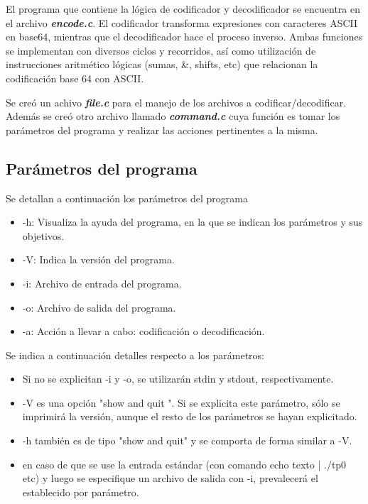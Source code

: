 \documentclass[10pt,a4paper]{article}
\begin{document}
El programa que contiene la lógica de codificador y decodificador se encuentra en el archivo \textit{\textbf{encode.c}}.
El codificador transforma expresiones con caracteres ASCII en base64, mientras que el decodificador hace el proceso inverso.
Ambas funciones se implementan con diversos ciclos y recorridos, así como utilización de instrucciones aritmético lógicas (sumas, \&, shifts, etc) que relacionan la codificación base 64 con ASCII.

Se creó un achivo \textit{\textbf{file.c}} para el manejo de los archivos a codificar/decodificar. Además se creó otro archivo llamado \textit{\textbf{command.c}} cuya función es tomar los parámetros del programa y realizar las acciones pertinentes a la misma. 

\newpage

\subsection{Parámetros del programa}

Se detallan a continuación los parámetros del programa

\begin{itemize}
    \item -h: Visualiza la ayuda del programa, en la que se indican los parámetros y sus objetivos.
    \item -V: Indica la versión del programa.
    \item -i: Archivo de entrada del programa.
    \item -o: Archivo de salida del programa.
    \item -a: Acción a llevar a cabo: codificación o decodificación.
\end{itemize}

Se indica a continuación detalles respecto a los parámetros:

\begin{itemize}
    \item Si no se explicitan -i y -o, se utilizarán stdin y stdout, respectivamente. 
    \item -V es una opción "show and quit ". Si se explicita este parámetro, sólo se imprimirá la versión, aunque el resto de los parámetros se hayan explicitado. 
    \item -h también es de tipo "show and quit" y se comporta de forma similar a -V.
    \item en caso de que se use la entrada estándar (con comando echo texto | ./tp0 etc) y luego se especifique un archivo de salida con -i, prevalecerá el establecido por parámetro.
\end{itemize}
\end{document}
